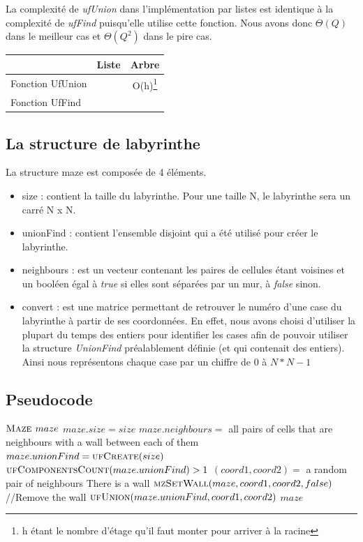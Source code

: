 La complexité de \textit{ufUnion} dans l'implémentation par listes est identique à la complexité de \textit{ufFind} puisqu'elle utilise cette fonction. Nous avons donc $\Theta(Q)$ dans le meilleur cas et $\Theta(Q^2)$ dans le pire cas.

	\begin{tabular}{|l||c|c|}
	\hline
  & Liste & Arbre\\
  \hline\hline
  Fonction UfUnion & & O(h)\footnote{h étant le nombre d'étage qu'il faut monter pour arriver à la racine} \\
  Fonction UfFind & & \\
  \hline
\end{tabular}

\subsection{} %
\subsection{} %

\subsection{La structure de labyrinthe} %
La structure maze est composée de 4 éléments.
\begin{itemize}
\item size : contient la taille du labyrinthe. Pour une taille N, le labyrinthe sera un carré N x N.
\item unionFind : contient l'ensemble disjoint qui a été utilisé pour créer le labyrinthe.
\item neighbours : est un vecteur contenant les paires de cellules étant voisines et un booléen égal à \textit{true} si elles sont séparées par un mur, à \textit{false} sinon.
\item convert : est une matrice permettant de retrouver le numéro d'une case du labyrinthe à partir de ses coordonnées.
\bigbreak
En effet, nous avons choisi d'utiliser la plupart du temps des entiers pour identifier les cases afin de pouvoir utiliser la structure \textit{UnionFind} préalablement définie (et qui contenait des entiers). Ainsi nous représentons chaque case par un chiffre de $0$ à $N *N - 1$
\end{itemize}

\subsection{Pseudocode} %
\begin{codebox}
\li $\textnormal{\scshape Maze } maze$
\li $maze.size = size$
\li $maze.neighbours =$ all pairs of cells that are neighbours with a wall between each of them
\li $maze.unionFind = \textnormal{\scshape ufCreate}(size)$
\li \While $\textnormal{\scshape ufComponentsCount}(maze.unionFind) > 1$
\Do
\li 	$(coord1, coord2) =$ a random pair of neighbours
\li		\If There is a wall
\li \Then $\textnormal{\scshape mzSetWall}(maze, coord1, coord2, false)$ //Remove the wall
\li	$\textnormal{\scshape ufUnion}(maze.unionFind, coord1, coord2)$
\End
\End
\li \Return $maze$
\End
\end{codebox}

